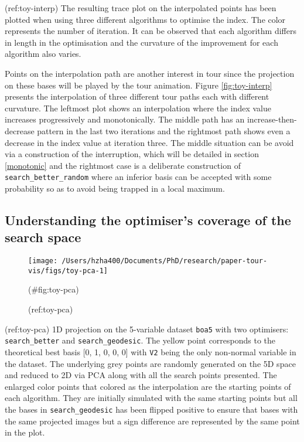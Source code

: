 (ref:toy-interp) The resulting trace plot on the interpolated points has been plotted when using three different algorithms to optimise the index. The color represents the number of iteration. It can be observed that each algorithm differs in length in the optimisation and the curvature of the improvement for each algorithm also varies.

Points on the interpolation path are another interest in tour since the projection on these bases will be played by the tour animation. Figure \ref{fig:toy-interp} presents the interpolation of three different tour paths each with different curvature. The leftmost plot shows an interpolation where the index value increases progressively and monotonically. The middle path has an increase-then-decrease pattern in the last two iterations and the rightmost path shows even a decrease in the index value at iteration three. The middle situation can be avoid via a construction of the interruption, which will be detailed in section \ref{monotonic} and the rightmost case is a deliberate construction of \texttt{search\_better\_random} where an inferior basis can be accepted with some probability so as to avoid being trapped in a local maximum.

\hypertarget{understanding-the-optimisers-coverage-of-the-search-space}{%
\subsection{Understanding the optimiser's coverage of the search space}\label{understanding-the-optimisers-coverage-of-the-search-space}}

\begin{Schunk}
\begin{figure}

{\centering \texttt{[image: /Users/hzha400/Documents/PhD/research/paper-tour-vis/figs/toy-pca-1]} 

}

\caption[(ref:toy-pca)]{(ref:toy-pca)}(\#fig:toy-pca)
\end{figure}
\end{Schunk}

(ref:toy-pca) 1D projection on the 5-variable dataset \texttt{boa5} with two optimisers: \texttt{search\_better} and \texttt{search\_geodesic}. The yellow point corresponds to the theoretical best basis {[}0, 1, 0, 0, 0{]} with \texttt{V2} being the only non-normal variable in the dataset. The underlying grey points are randomly generated on the 5D space and reduced to 2D via PCA along with all the search points presented. The enlarged color points that colored as the interpolation are the starting points of each algorithm. They are initially simulated with the same starting points but all the bases in \texttt{search\_geodesic} has been flipped positive to ensure that bases with the same projected images but a sign difference are represented by the same point in the plot.

